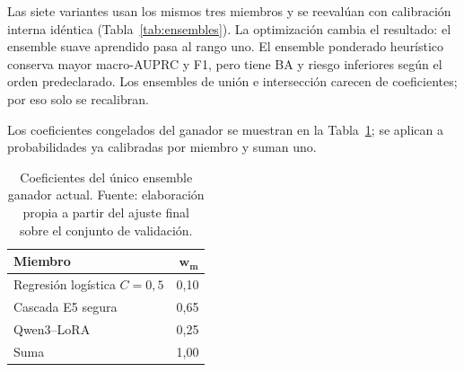 Las siete variantes usan los mismos tres miembros y se reevalúan con calibración interna idéntica (Tabla~\ref{tab:ensembles}). La optimización cambia el resultado: el ensemble suave aprendido pasa al rango uno. El ensemble ponderado heurístico conserva mayor macro-AUPRC y F1, pero tiene BA y riesgo inferiores según el orden predeclarado. Los ensembles de unión e intersección carecen de coeficientes; por eso solo se recalibran.

\begin{table}[t]
\centering
\caption{Comparación de las siete variantes de ensemble mediante validación anidada. Fuente: elaboración propia a partir del cuaderno reproducible de optimización.}
\label{tab:ensembles}
\footnotesize
{}
\end{table}

Los coeficientes congelados del ganador se muestran en la Tabla~\ref{tab:pesos_ganador}; se aplican a probabilidades ya calibradas por miembro y suman uno.

\begin{table}[t]
\centering
\caption{Coeficientes del único ensemble ganador actual. Fuente: elaboración propia a partir del ajuste final sobre el conjunto de validación.}
\label{tab:pesos_ganador}
\footnotesize
\begin{tabular}{@{}lr@{}}
\toprule
\textbf{Miembro} & $\boldsymbol{w_m}$ \\
\midrule
Regresión logística $C=0,5$ & 0,10 \\
Cascada E5 segura & 0,65 \\
Qwen3--LoRA & 0,25 \\
\midrule
Suma & 1,00 \\
\bottomrule
\end{tabular}
\end{table}

